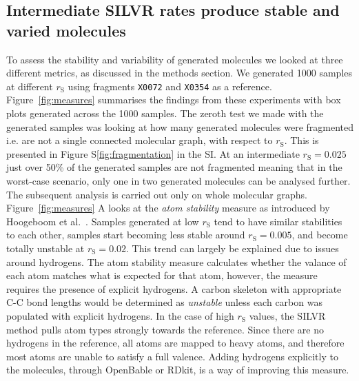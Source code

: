 \documentclass[journal=jacsat,manuscript=article]{achemso}
\begin{document}
\subsection{Intermediate SILVR rates produce stable and varied molecules}
To assess the stability and variability of generated molecules we looked at three different metrics, as discussed in the methods section. We generated 1000 samples at different $r_{\mathrm{S}}$ using fragments \texttt{X0072} and \texttt{X0354} as a reference. Figure~\ref{fig:measures} summarises the findings from these experiments with box plots generated across the 1000 samples. The zeroth test we made with the generated samples was looking at how many generated molecules were fragmented i.e. are not a single connected molecular graph, with respect to $r_{\mathrm{S}}$. This is presented in Figure S\ref{fig:fragmentation} in the SI. At an intermediate $r_{\mathrm{S}} = 0.025$ just over 50\% of the generated samples are not fragmented meaning that in the worst-case scenario, only one in two generated molecules can be analysed further. The subsequent analysis is carried out only on whole molecular graphs. 
Figure~\ref{fig:measures} A looks at the \textit{atom stability} measure as introduced by Hoogeboom et al.~\cite{hoogeboom2022equivariant}. Samples generated at low $r_{\mathrm{S}}$ tend to have similar stabilities to each other, samples start becoming less stable around $r_{\mathrm{S}}=0.005$, and become totally unstable at $r_{\mathrm{S}}=0.02$. This trend can largely be explained due to issues around hydrogens. The atom stability measure calculates whether the valance of each atom matches what is expected for that atom, however, the measure requires the presence of explicit hydrogens. A carbon skeleton with appropriate C-C bond lengths would be determined as \textit{unstable} unless each carbon was populated with explicit hydrogens. In the case of high $r_{\mathrm{S}}$ values, the SILVR method pulls atom types strongly towards the reference. Since there are no hydrogens in the reference, all atoms are mapped to heavy atoms, and therefore most atoms are unable to satisfy a full valence. Adding hydrogens explicitly to the molecules, through OpenBable or RDkit, is a way of improving this measure. 
\end{document}
